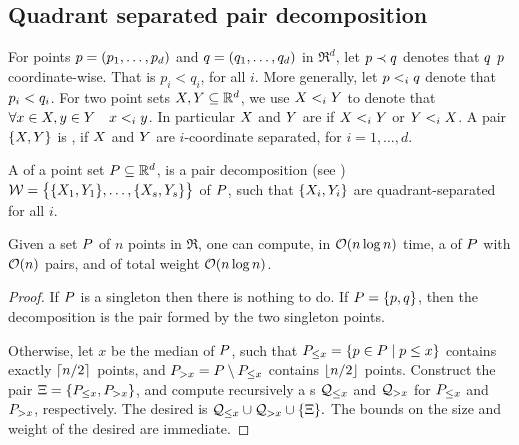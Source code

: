 \documentclass[12pt]{article}%
\begin{document}
\subsection{Quadrant separated pair decomposition}

For points $p = (p_1, \ldots, p_d)$ and $q = (q_1, \ldots, q_d)$
in $\Re^d$, let $p \prec q$ denotes that $q$ 
$p$ coordinate-wise. That is $p_i < q_i$, for all $i$. More
generally, let $p <_i q$ denote that $p_i < q_i$. For two
point sets $X, Y \subseteq \mathbb{R}^d$, we use $X <_i Y$ to
denote that $\forall x \in X, y \in Y \quad x <_i y$.
In particular $X$ and $Y$ are 
if $X <_i Y$ or $Y <_i X$. A pair $\{ X, Y\}$ is
, if $X$ and $Y$ are $i$-coordinate
separated, for $i=1,\ldots, d$.

A  of a point set
$P \subseteq \mathbb{R}^d$, is a pair decomposition (see
)
$\mathcal{W} = \bigl\{ \{ X_1, Y_1 \}, \ldots, \{ X_s, Y_s \}
\bigr\}$ of $P$, such that $\{ X_i, Y_i\}$ are
quadrant-separated for all $i$.


\begin{lemma}
    Given a set $P$ of $n$ points in $\Re$, one can compute, in
    $\mathcal{O}( n \log n)$ time, a \QSPD of $P$ with $\mathcal{O}(n)$ pairs, and
    of total weight $\mathcal{O}( n \log n)$.
\end{lemma}
\begin{proof}
    If $P$ is a singleton then there is nothing to do. If
    $P = \{ p, q \}$, then the decomposition is the pair formed
    by the two singleton points.

    Otherwise, let $x$ be the median of $P$, such that
    $P_{\leq x} = \left\{  p \in P  \;\middle\vert\; p \leq x \right\}$ contains exactly
    $\left\lceil {n/2} \right\rceil$ points, and $P_{> x} = P \setminus P_{\leq x}$
    contains $\left\lfloor {n/2} \right\rfloor$ points. Construct the pair
    $\Xi = \{ P_{\leq x}, P_{> x} \}$, and compute recursively a
    \QSPD{}s $\mathcal{Q}_{\leq x}$ and $\mathcal{Q}_{> x}$ for $P_{\leq x}$ and
    $P_{> x}$, respectively. The desired \QSPD is
    \begin{math}
        \mathcal{Q}_{\leq x} \cup \mathcal{Q}_{> x} \cup \{ \Xi \}.
    \end{math}
    The bounds on the size and weight of the desired \QSPD are
    immediate.
\end{proof}
\end{document}
